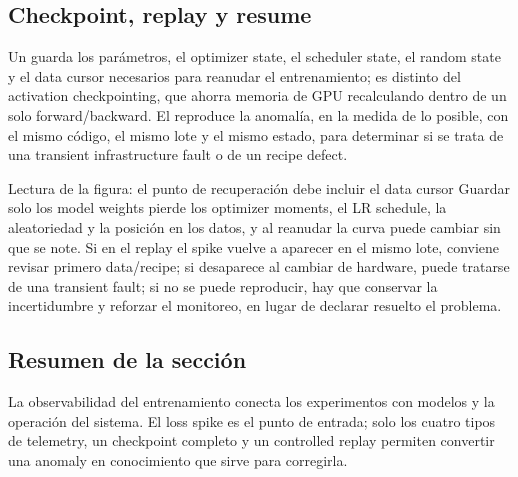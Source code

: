 \subsection{Checkpoint, replay y resume}

Un  guarda los parámetros, el optimizer state, el scheduler state, el random state y el data cursor necesarios para reanudar el entrenamiento; es distinto del activation checkpointing, que ahorra memoria de GPU recalculando dentro de un solo forward/backward. El  reproduce la anomalía, en la medida de lo posible, con el mismo código, el mismo lote y el mismo estado, para determinar si se trata de una transient infrastructure fault o de un recipe defect.


\begin{knowledgebox}{Lectura de la figura: el punto de recuperación debe incluir el data cursor}
Guardar solo los model weights pierde los optimizer moments, el LR schedule, la aleatoriedad y la posición en los datos, y al reanudar la curva puede cambiar sin que se note. Si en el replay el spike vuelve a aparecer en el mismo lote, conviene revisar primero data/recipe; si desaparece al cambiar de hardware, puede tratarse de una transient fault; si no se puede reproducir, hay que conservar la incertidumbre y reforzar el monitoreo, en lugar de declarar resuelto el problema.
\end{knowledgebox}


\subsection{Resumen de la sección}

La observabilidad del entrenamiento conecta los experimentos con modelos y la operación del sistema. El loss spike es el punto de entrada; solo los cuatro tipos de telemetry, un checkpoint completo y un controlled replay permiten convertir una anomaly en conocimiento que sirve para corregirla.
